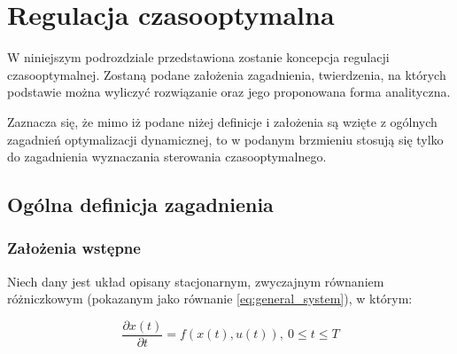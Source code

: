 \section{Regulacja czasooptymalna}
\label{sec:toc}

W niniejszym podrozdziale przedstawiona zostanie koncepcja regulacji czasooptymalnej. Zostaną podane założenia zagadnienia, twierdzenia, na których podstawie można wyliczyć rozwiązanie oraz jego proponowana forma analityczna.

Zaznacza się, że mimo iż podane niżej definicje i założenia są wzięte z ogólnych zagadnień optymalizacji dynamicznej, to w podanym brzmieniu stosują się tylko do zagadnienia wyznaczania sterowania czasooptymalnego.

\subsection{Ogólna definicja zagadnienia}
\label{sub:toc-def}

\subsubsection{Założenia wstępne}
\label{sub:toc-def-intro}
Niech dany jest układ opisany stacjonarnym, zwyczajnym równaniem różniczkowym (pokazanym jako równanie \ref{eq:general_system}), w którym:

\begin{equation}\label{eq:general_system}
    \frac{\partial x(t)}{\partial t} = f(x(t), u(t)), ~ 0 \leq t \leq T
\end{equation}

